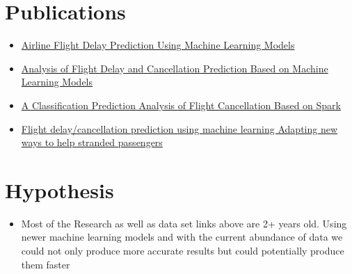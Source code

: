 \section{Publications}
\begin{itemize}
    \item \href{https://dl.acm.org/doi/fullHtml/10.1145/3497701.3497725}{Airline Flight Delay Prediction Using Machine Learning Models}
    \item \href{https://ieeexplore.ieee.org/document/9731090}{Analysis of Flight Delay and Cancellation Prediction Based on Machine Learning Models}
    \item \href{https://www.sciencedirect.com/science/article/pii/S1877050919320241}{A Classification Prediction Analysis of Flight Cancellation Based on Spark}
    \item \href{https://www.researchgate.net/publication/344267036_Flight_delaycancellation_prediction_using_machine_learning_Adapting_new_ways_to_help_stranded_passengers}{Flight delay/cancellation prediction using machine learning Adapting new ways to help stranded passengers}
\end{itemize}

\section{Hypothesis}
\begin{itemize}
    \item Most of the Research as well as data set links above are 2+ years old. Using newer machine learning models and with the current abundance of data we could not only produce more accurate results but could potentially produce them faster
\end{itemize}